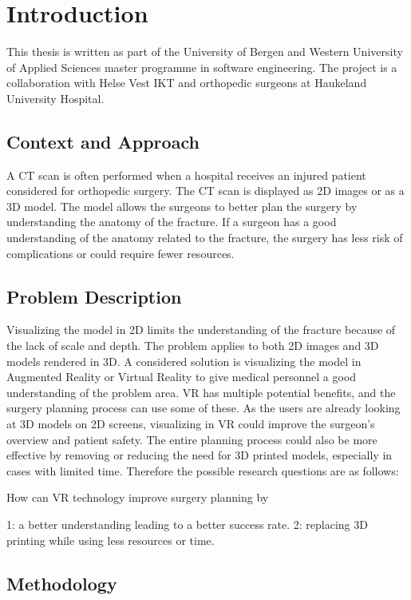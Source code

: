 \documentclass[a4paper]{report}
\begin{document}

\chapter{Introduction}
This thesis is written as part of the University of Bergen and Western University of Applied Sciences master programme in software engineering. The project is a collaboration with Helse Vest IKT and orthopedic surgeons at Haukeland University Hospital.


\section{Context and Approach}
A CT scan is often performed when a hospital receives an injured patient considered for orthopedic surgery. The CT scan is displayed as 2D images or as a 3D model. The model allows the surgeons to better plan the surgery by understanding the anatomy of the fracture.
If a surgeon has a good understanding of the anatomy related to the fracture,
the surgery has less risk of complications or could require fewer resources.

\section{Problem Description}
Visualizing the model in 2D limits the understanding of the fracture because of the lack of scale and depth. The problem applies to both 2D images and 3D models rendered in 3D.
A considered solution is visualizing the model in Augmented Reality or Virtual Reality to give medical personnel a good understanding of the problem area.
VR has multiple potential benefits, and the surgery planning process can use some of these. As the users are already looking at 3D models on 2D screens, visualizing in VR could improve the surgeon's overview and patient safety. The entire planning process could also be more effective by removing or reducing the need for 3D printed models, especially in cases with limited time. Therefore the possible research questions are as follows:

How can VR technology improve surgery planning by

1: a better understanding leading to a better success rate.
2: replacing 3D printing while using less resources or time.

\section{Methodology}
\end{document}
